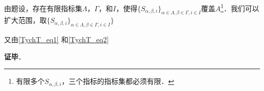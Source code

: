 由题设，存在有限指标集$\Lambda$，$\Gamma$，和$I$，使得$\{S_{\alpha, \beta, i}\}_{\alpha\in \Lambda, \beta\in \Gamma, i\in I}$覆盖$A$\footnote{有限多个$S_{\alpha, \beta, i}$，三个指标的指标集都必须有限．}．我们可以扩大范围，取$\{S_{\alpha, \beta, i}\}_{\alpha\in \Lambda, \beta\in \Gamma, i\in I}\}$

又由\autoref{TychT_eq1} 和\autoref{TychT_eq2} 

\textbf{证毕}．























